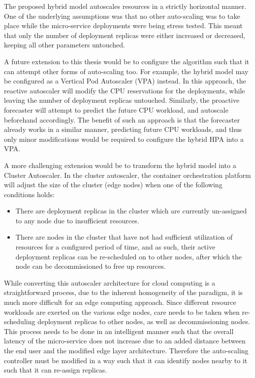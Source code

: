 The proposed hybrid model autoscales resources in a strictly horizontal manner. One of the underlying assumptions was that no other auto-scaling was to take place while the micro-service deployments were being stress tested. This meant that only the number of deployment replicas were either increased or decreased, keeping all other parameters untouched.\par

A future extension to this thesis would be to configure the algorithm such that it can attempt other forms of auto-scaling too. For example, the hybrid model may be configured as a Vertical Pod Autoscaler (VPA) instead. In this approach, the reactive autoscaler will modify the CPU reservations for the deployments, while leaving the number of deployment replicas untouched. Similarly, the proactive forecaster will attempt to predict the future CPU workload, and autoscale beforehand accordingly. The benefit of such an approach is that the forecaster already works in a similar manner, predicting future CPU workloads, and thus only minor modifications would be required to configure the hybrid HPA into a VPA.\par

A more challenging extension would be to transform the hybrid model into a Cluster Autoscaler. In the cluster autoscaler, the container orchestration platform will adjust the size of the cluster (edge nodes) when one of the following conditions holds:

\begin{itemize}
    \item There are deployment replicas in the cluster which are currently un-assigned to any node due to insufficient resources.
    \item There are nodes in the cluster that have not had sufficient utilization of resources for a configured period of time, and as such, their active deployment replicas can be re-scheduled on to other nodes, after which the node can be decommissioned to free up resources.
\end{itemize}

While converting this autoscaler architecture for cloud computing is a straightforward process, due to the inherent homogeneity of the paradigm, it is much more difficult for an edge computing approach. Since different resource workloads are exerted on the various edge nodes, care needs to be taken when re-scheduling deployment replicas to other nodes, as well as decommissioning nodes. This process needs to be done in an intelligent manner such that the overall latency of the micro-service does not increase due to an added distance between the end user and the modified edge layer architecture. Therefore the auto-scaling controller must be modified in a way such that it can identify nodes nearby to it such that it can re-assign replicas.

